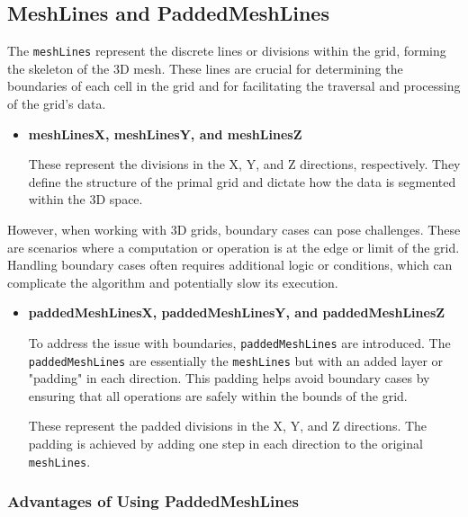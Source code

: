 \subsection{MeshLines and PaddedMeshLines} \label{meshLines}

The \texttt{meshLines} represent the discrete lines or divisions within the grid, forming the skeleton of the 3D mesh. These lines are crucial for determining the boundaries of each cell in the grid and for facilitating the traversal and processing of the grid's data.

\noindent \begin{itemize}
\item \textbf{meshLinesX, meshLinesY, and meshLinesZ} 
    
These represent the divisions in the X, Y, and Z directions, respectively. They define the structure of the primal grid and dictate how the data is segmented within the 3D space.

\end{itemize}

\noindent However, when working with 3D grids, boundary cases can pose challenges. These are scenarios where a computation or operation is at the edge or limit of the grid. Handling boundary cases often requires additional logic or conditions, which can complicate the algorithm and potentially slow its execution.

\noindent \begin{itemize}
\item \textbf{paddedMeshLinesX, paddedMeshLinesY, and paddedMeshLinesZ} 

To address the issue with boundaries, \texttt{paddedMeshLines} are introduced. The \texttt{paddedMeshLines} are essentially the \texttt{meshLines} but with an added layer or "padding" in each direction. This padding helps avoid boundary cases by ensuring that all operations are safely within the bounds of the grid.

These represent the padded divisions in the X, Y, and Z directions. The padding is achieved by adding one step in each direction to the original \texttt{meshLines}.

\end{itemize}

\subsubsection{Advantages of Using PaddedMeshLines}

